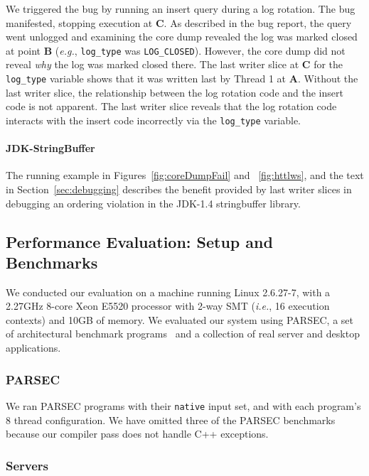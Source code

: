 \documentclass[preprint,9pt]{sigplanconf}
\begin{document}
We triggered the bug by running an insert query during a log rotation.  The bug
manifested, stopping execution at {\bf C}.  As described in the bug report, the
query went unlogged and examining the core dump revealed the log was marked
closed at point {\bf B} ({\em e.g.}, {\tt log\_type} was {\tt LOG\_CLOSED}).
However, the core dump did not reveal {\em why} the log was marked closed
there.  The last writer slice at {\bf C} for the {\tt log\_type} variable shows
that it was written last by Thread 1 at {\bf A}.  Without the last writer
slice, the relationship between the log rotation code and the insert code is
not apparent. The last writer slice reveals that the log rotation code
interacts with the insert code incorrectly via the {\tt log\_type} variable.  


\paragraph{JDK-StringBuffer}

The running example in Figures~\ref{fig:coreDumpFail} and ~\ref{fig:httlws},
and the text in Section~\ref{sec:debugging} describes the benefit provided by
last writer slices in debugging an ordering violation in the JDK-1.4 stringbuffer library.  



\subsection{Performance Evaluation: Setup and Benchmarks}

We conducted our evaluation on a machine running Linux 2.6.27-7, with a 2.27GHz
8-core Xeon E5520 processor with 2-way SMT ({\em i.e.}, 16 execution contexts)
and 10GB of memory.  We evaluated our system using PARSEC, a set of
architectural benchmark programs~\cite{parsec} and a collection of real server
and desktop applications.    

\subsubsection{PARSEC}

We ran PARSEC programs with their {\tt native} input set, and with each
program's 8 thread configuration. We have omitted three of the PARSEC
benchmarks because our compiler pass does not handle C++ exceptions.    

\subsubsection{Servers}
\end{document}
